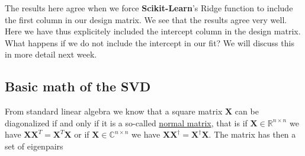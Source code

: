 \documentclass[%
oneside,                 %
final,                   %
10pt]{article}
\begin{document}
The results here agree when we force \textbf{Scikit-Learn}'s Ridge function to include the first column in our design matrix.
We see that the results agree very well. Here we have thus explicitely included the intercept column in the design matrix.
What happens if we do not include the intercept in our fit? We will discuss this in more detail next week.

\subsection*{Basic math of the SVD}

From standard linear algebra we know that a square matrix $\bm{X}$ can be diagonalized if and only if it is 
a so-called \href{{https://en.wikipedia.org/wiki/Normal_matrix}}{normal matrix}, that is if $\bm{X}\in {\mathbb{R}}^{n\times n}$
we have $\bm{X}\bm{X}^T=\bm{X}^T\bm{X}$ or if $\bm{X}\in {\mathbb{C}}^{n\times n}$ we have $\bm{X}\bm{X}^{\dagger}=\bm{X}^{\dagger}\bm{X}$.
The matrix has then a set of eigenpairs 
\end{document}
